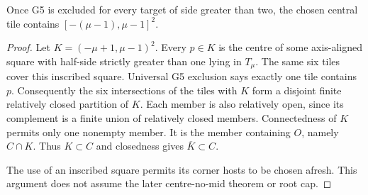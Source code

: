\begin{lemma}\label{lem:central-box}
Once G5 is excluded for every target of side greater than two, the chosen
central tile contains $[-(\mu-1),\mu-1]^2$.
\end{lemma}
\begin{proof}
Let $K=(-\mu+1,\mu-1)^2$. Every $p\in K$ is the centre of some
axis-aligned square with half-side strictly greater than one lying in
$T_\mu$. The same six tiles cover this inscribed square. Universal G5
exclusion says exactly one tile contains $p$.
Consequently the six intersections of the tiles with $K$ form a disjoint
finite relatively closed partition of $K$. Each member is also relatively
open, since its complement is a finite union of relatively closed members.
Connectedness of $K$ permits only one nonempty member. It is the member
containing $O$, namely $C\cap K$. Thus $K\subset C$ and closedness gives
$\overline K\subset C$.

The use of an inscribed square permits its corner hosts to be chosen afresh.
This argument does not assume the later centre-no-mid theorem or root cap.
\end{proof}

